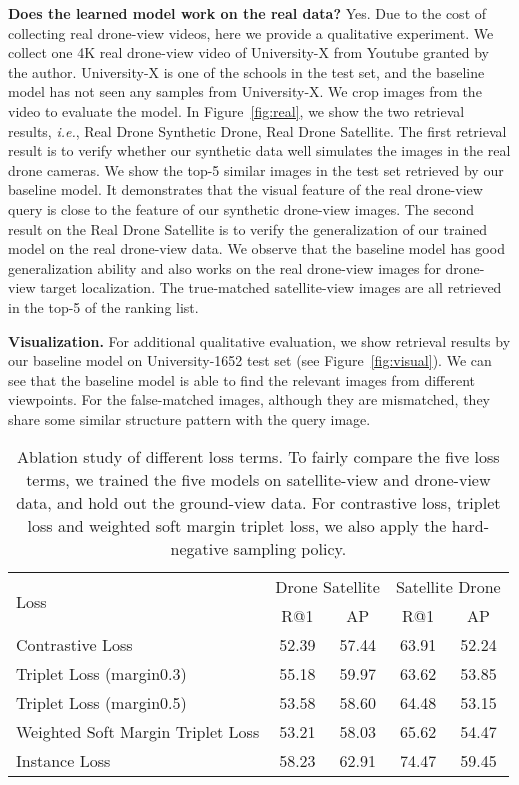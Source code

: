 \documentclass[sigconf]{acmart}
\def\ie{\emph{i.e.}}
\begin{document}
\noindent\textbf{Does the learned model work on the real data?} Yes. Due to the cost of collecting real drone-view videos, here we provide a qualitative experiment. We collect one 4K real drone-view video of University-X from Youtube granted by the author. University-X is one of the schools in the test set, and the baseline model has not seen any samples from University-X. We crop images from the video to evaluate the model. In Figure~\ref{fig:real}, we show the two retrieval results, \ie, Real Drone  Synthetic Drone, Real Drone  Satellite. The first retrieval result is to verify whether our synthetic data well simulates the images in the real drone cameras. We show the top-5 similar images in the test set retrieved by our baseline model. It demonstrates that the visual feature of the real drone-view query is close to the feature of our synthetic drone-view images.
The second result on the Real Drone  Satellite is to verify the generalization of our trained model on the real drone-view data. We observe that the baseline model has good generalization ability and also works on the real drone-view images for drone-view target localization. The true-matched satellite-view images are all retrieved in the top-5 of the ranking list.



\noindent\textbf{Visualization.} For additional qualitative evaluation, we show retrieval results by our baseline model on University-1652 test set (see Figure~\ref{fig:visual}). We can see that the baseline model is able to find the relevant images from different viewpoints. For the false-matched images, although they are mismatched, they share some similar structure pattern with the query image.

\setlength{\tabcolsep}{1pt}
\begin{table}
\small
\begin{center}
\begin{tabular}{l|cc|cc}
\hline
\multirow{2}{*}{Loss} & \multicolumn{2}{c|}{Drone  Satellite} & \multicolumn{2}{c}{Satellite  Drone}\\
  & R@1 & AP & R@1 & AP\\
\shline
Contrastive Loss & 52.39 & 57.44 & 63.91 & 52.24\\
Triplet Loss (margin0.3)  & 55.18 & 59.97 & 63.62 & 53.85 \\
Triplet Loss (margin0.5)  & 53.58 & 58.60 & 64.48 & 53.15 \\
Weighted Soft Margin Triplet Loss & 53.21 & 58.03 & 65.62 & 54.47\\
Instance Loss & 58.23 & 62.91 & 74.47 & 59.45 \\
\hline
\end{tabular}
\end{center}
\caption{Ablation study of different loss terms. To fairly compare the five loss terms, we trained the five models on satellite-view and drone-view data, and hold out the ground-view data. For contrastive loss, triplet loss and weighted soft margin triplet loss, we also apply the hard-negative sampling policy.
}
\label{table:loss}
\end{table}
\end{document}
